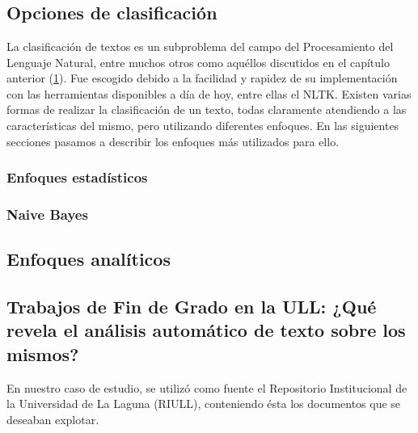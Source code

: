 \chapter{\ChapterTwo{}} \label{amigo}
\lhead{\emph{\ChapterTwo{}}}

\section{Opciones de clasificación}

La clasificación de textos es un subproblema del campo del Procesamiento del Lenguaje Natural, entre muchos otros como aquéllos discutidos en el capítulo anterior (\ref{amigo}).
%
Fue escogido debido a la facilidad y rapidez de su implementación con las herramientas disponibles a día de hoy, entre ellas el NLTK.
%
Existen varias formas de realizar la clasificación de un texto, todas claramente atendiendo a las características del mismo, pero utilizando diferentes enfoques.
%
En las siguientes secciones pasamos a describir los enfoques más utilizados para ello.

\subsection{Enfoques estadísticos}



\subsection{Naive Bayes}



\section{Enfoques analíticos}



\section{Trabajos de Fin de Grado en la ULL: ¿Qué revela el análisis automático de texto sobre los mismos?}
En nuestro caso de estudio, se utilizó como fuente el Repositorio Institucional de la Universidad de La Laguna (RIULL), conteniendo ésta los documentos que se deseaban explotar.


